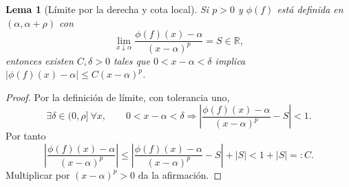 \documentclass[11pt,a4paper]{article}
\numberwithin{equation}{section}
\newtheorem{lemma}[theorem]{Lema}
\theoremstyle{definition}
\theoremstyle{remark}
\newcommand{\R}{\mathbb R}
\begin{document}
\begin{lemma}[Límite por la derecha y cota local]\label{lem:rightbound}
Si $p>0$ y $\phi(f)$ está definida en $(\alpha,\alpha+\rho)$ con
\[
\lim_{x\downarrow\alpha}\frac{\phi(f)(x)-\alpha}{(x-\alpha)^p}=S\in\R,
\]
entonces existen $C,\delta>0$ tales que $0<x-\alpha<\delta$ implica
$|\phi(f)(x)-\alpha|\le C(x-\alpha)^p$.
\end{lemma}
\begin{proof}
Por la definición de límite, con tolerancia uno,
\[
\exists\delta\in(0,\rho]\ \forall x,\qquad
0<x-\alpha<\delta\Longrightarrow
\left|\frac{\phi(f)(x)-\alpha}{(x-\alpha)^p}-S\right|<1.
\]
Por tanto
\[
\left|\frac{\phi(f)(x)-\alpha}{(x-\alpha)^p}\right|
\le\left|\frac{\phi(f)(x)-\alpha}{(x-\alpha)^p}-S\right|+|S|
<1+|S|=:C.
\]
Multiplicar por $(x-\alpha)^p>0$ da la afirmación.
\end{proof}
\end{document}
